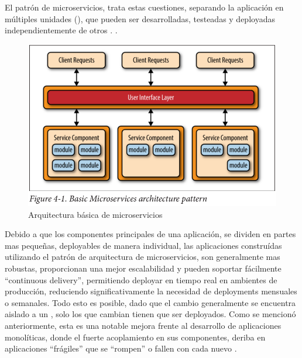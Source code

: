 El patrón de microservicios, trata estas cuestiones, separando la aplicación en múltiples unidades  (), que pueden ser desarrolladas, testeadas y deployadas independientemente de otros . .\cite[p.~27]{richards2015}

\begin{figure}
  \includegraphics[width=\linewidth]{src/images/02-capitulo-2/basic_microservices_arquitecture_pattern.png}
  \caption{Arquitectura básica de microservicios}
  \label{fig:basic_microservices_arquitecture_pattern}
\end{figure}

Debido a que los componentes principales de una aplicación, se dividen en partes mas pequeñas, deployables de manera individual, las aplicaciones construídas utilizando el patrón de arquitectura de microservicios, son generalmente mas robustas, proporcionan una mejor escalabilidad y pueden soportar fácilmente ``continuous delivery'', permitiendo deployar en tiempo real en ambientes de producción, reduciendo significativamente la necesidad de deployments mensuales o semanales. \cite[p.~33]{richards2015} Todo esto es posible, dado que el cambio generalmente se encuentra aislado a un , solo los  que cambian tienen que ser deployados.  Como se mencionó anteriormente, esta es una notable mejora frente al desarrollo de aplicaciones monolíticas, donde el fuerte acoplamiento en sus componentes, deriba en aplicaciones ``frágiles'' que se ``rompen'' o fallen con cada nuevo .


